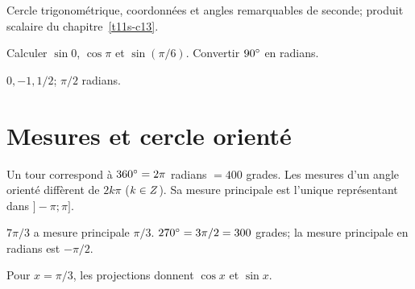 \label{t11s-c16}
\begin{revision}Cercle trigonométrique, coordonnées et angles remarquables de seconde; produit scalaire du chapitre~\ref{t11s-c13}.\end{revision}
\begin{automatismes}\exo\label{t11s-c16-auto}Calculer $\sin0$, $\cos\pi$ et $\sin(\pi/6)$. Convertir $90^{\circ}$ en radians.\end{automatismes}
\begin{corrige}\label{sol-t11s-c16-auto}$0,-1,1/2$; $\pi/2$ radians.\end{corrige}

\section{Mesures et cercle orienté}
\begin{definition}Un tour correspond à $360^{\circ}=2\pi$ radians $=400$ grades. Les mesures d’un angle orienté diffèrent de $2k\pi$ ($k\in Z$). Sa mesure principale est l’unique représentant dans $]-\pi;\pi]$.\end{definition}
\begin{exemple}$7\pi/3$ a mesure principale $\pi/3$. $270^{\circ}=3\pi/2=300$ grades; la mesure principale en radians est $-\pi/2$.\end{exemple}
\begin{visualisation}
\begin{center}\end{center}
Pour $x=\pi/3$, les projections donnent $\cos x$ et $\sin x$.
\end{visualisation}
